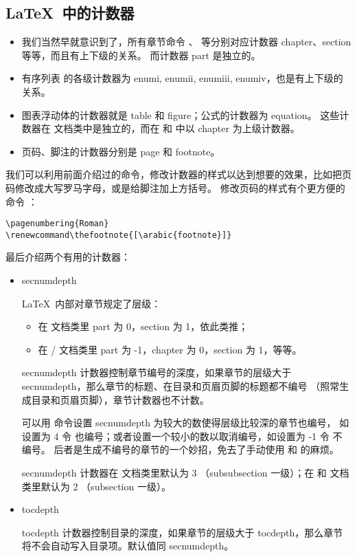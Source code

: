 \subsection{\LaTeX\ 中的计数器}\label{subsec:latex-counts}

\begin{itemize}
  \item 我们当然早就意识到了，所有章节命令 、 等分别对应计数器 chapter、section 等等，而且有上下级的关系。
而计数器 part 是独立的。
  \item 有序列表  的各级计数器为 enumi, enumii, enumiii, enumiv，也是有上下级的关系。
  \item 图表浮动体的计数器就是 table 和 figure；公式的计数器为 equation。
  这些计数器在  文档类中是独立的，而在  和  中以 chapter 为上级计数器。
  \item 页码、脚注的计数器分别是 page 和 footnote。
\end{itemize}

我们可以利用前面介绍过的命令，修改计数器的样式以达到想要的效果，比如把页码修改成大写罗马字母，或是给脚注加上方括号。
修改页码的样式有个更方便的命令 ：
\begin{verbatim}
\pagenumbering{Roman}
\renewcommand\thefootnote{[\arabic{footnote}]}
\end{verbatim}

最后介绍两个有用的计数器：

\begin{itemize}
  \item secnumdepth 

  \LaTeX\ 内部对章节规定了层级：
  \begin{itemize}
    \item 在  文档类里 part 为 0，section 为 1，依此类推；
    \item 在 / 文档类里 part 为 -1，chapter 为 0，section 为 1，等等。
  \end{itemize}

  secnumdepth 计数器控制章节编号的深度，如果章节的层级大于 secnumdepth，那么章节的标题、在目录和页眉页脚的标题都不编号
  （照常生成目录和页眉页脚），章节计数器也不计数。

  可以用  命令设置 secnumdepth 为较大的数使得层级比较深的章节也编号，
  如设置为 4 令  也编号；或者设置一个较小的数以取消编号，如设置为 -1 令  不编号。
  后者是生成不编号的章节的一个妙招，免去了手动使用  和  的麻烦。

  secnumdepth 计数器在  文档类里默认为 3 （subsubsection 一级）；在  和  文档类里默认为 2 （subsection 一级）。

  \item tocdepth 

  tocdepth 计数器控制目录的深度，如果章节的层级大于 tocdepth，那么章节将不会自动写入目录项。默认值同 secnumdepth。
\end{itemize}

\endinput